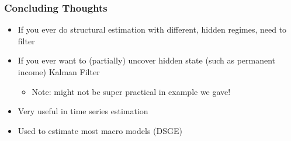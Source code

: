\documentclass{beamer}
\begin{document}
\begin{frame}
\frametitle[alignment=center]{Concluding Thoughts}
\begin{itemize}
\item If you ever do structural estimation with different, hidden regimes, need to filter
\bigskip
\item If you ever want to (partially) uncover hidden state (such as permanent income) Kalman Filter
\bigskip
\begin{itemize}
\item Note:  might not be super practical in example we gave!
\end{itemize}
\bigskip
\item Very useful in time series estimation
\bigskip
\item Used to estimate most macro models (DSGE)
\end{itemize}
\end{frame}
\end{document}
